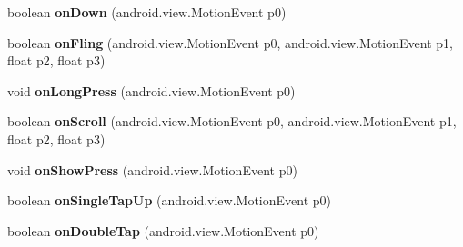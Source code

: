 \begin{DoxyCompactItemize}
\item 
\mbox{\label{classmd5b60ffeb829f638581ab2bb9b1a7f4f3f_1_1_inner_gesture_listener_a040c94c7721114d95025411a4eed94ff}} 
boolean {\bfseries on\+Down} (android.\+view.\+Motion\+Event p0)
\item 
\mbox{\label{classmd5b60ffeb829f638581ab2bb9b1a7f4f3f_1_1_inner_gesture_listener_a1756e2693a60f1d3742380e89f01051f}} 
boolean {\bfseries on\+Fling} (android.\+view.\+Motion\+Event p0, android.\+view.\+Motion\+Event p1, float p2, float p3)
\item 
\mbox{\label{classmd5b60ffeb829f638581ab2bb9b1a7f4f3f_1_1_inner_gesture_listener_a6ba34beec4f15b2b99e347516a70bf48}} 
void {\bfseries on\+Long\+Press} (android.\+view.\+Motion\+Event p0)
\item 
\mbox{\label{classmd5b60ffeb829f638581ab2bb9b1a7f4f3f_1_1_inner_gesture_listener_acc5b84dc58658cb693ceb013d18483d0}} 
boolean {\bfseries on\+Scroll} (android.\+view.\+Motion\+Event p0, android.\+view.\+Motion\+Event p1, float p2, float p3)
\item 
\mbox{\label{classmd5b60ffeb829f638581ab2bb9b1a7f4f3f_1_1_inner_gesture_listener_a4a73104a37519a590fd0d475acd83095}} 
void {\bfseries on\+Show\+Press} (android.\+view.\+Motion\+Event p0)
\item 
\mbox{\label{classmd5b60ffeb829f638581ab2bb9b1a7f4f3f_1_1_inner_gesture_listener_ade097b243cdda0818112d29738cad2ae}} 
boolean {\bfseries on\+Single\+Tap\+Up} (android.\+view.\+Motion\+Event p0)
\item 
\mbox{\label{classmd5b60ffeb829f638581ab2bb9b1a7f4f3f_1_1_inner_gesture_listener_a8c613557a8dfb0a91caaf5e981d6958f}} 
boolean {\bfseries on\+Double\+Tap} (android.\+view.\+Motion\+Event p0)

\end{DoxyCompactItemize}
